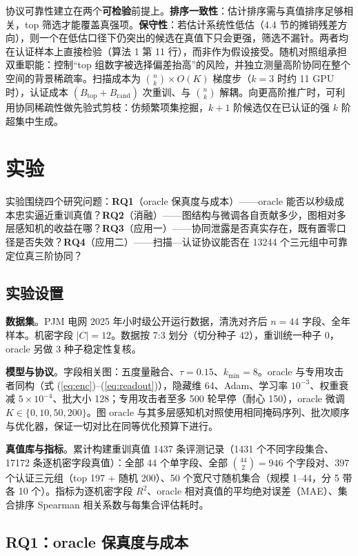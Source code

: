 \documentclass[10.5pt,compsoc,UTF8]{CjC}
\theoremstyle{mystyle}
\begin{document}
协议可靠性建立在两个\textbf{可检验}前提上。\textbf{排序一致性}：估计排序需与真值排序足够相关，top 筛选才能覆盖真强项。\textbf{保守性}：若估计系统性低估（4.4 节的摊销残差方向），则一个在低估口径下仍突出的候选在真值下只会更强，筛选不漏针。两者均在认证样本上直接检验（算法 1 第 11 行），而非作为假设接受。随机对照组承担双重职能：控制“top 组数字被选择偏差抬高”的风险，并独立测量高阶协同在整个空间的背景稀疏率。扫描成本为 $\binom{n}{k}\times O(K)$ 梯度步（$k=3$ 时约 11 GPU 时），认证成本 $(B_{\mathrm{top}}+B_{\mathrm{rand}})$ 次重训、与 $\binom{n}{k}$ 解耦。向更高阶推广时，可利用协同稀疏性做先验式剪枝：仿频繁项集挖掘，$k{+}1$ 阶候选仅在已认证的强 $k$ 阶超集中生成。

\section{\heiti 实验}

实验围绕四个研究问题：\textbf{RQ1}（oracle 保真度与成本）——oracle 能否以秒级成本忠实逼近重训真值？\textbf{RQ2}（消融）——图结构与微调各自贡献多少，图相对多层感知机的收益在哪？\textbf{RQ3}（应用一）——协同泄露是否真实存在，既有置零口径是否失效？\textbf{RQ4}（应用二）——扫描—认证协议能否在 13244 个三元组中可靠定位真三阶协同？

\subsection{实验设置}

\textbf{数据集}。PJM 电网 2025 年小时级公开运行数据，清洗对齐后 $n=44$ 字段、全年样本。机密字段 $|C|=12$。数据按 7:3 划分（切分种子 42），重训统一种子 0，oracle 另做 3 种子稳定性复核。

\textbf{模型与协议}。字段相关图：五度量融合、$\tau=0.15$、$k_{\min}=8$。oracle 与专用攻击者同构（式 (\ref{eq:enc})--(\ref{eq:readout})），隐藏维 64、Adam、学习率 $10^{-3}$、权重衰减 $5\times10^{-4}$、批大小 128；专用攻击者至多 500 轮早停（耐心 150），oracle 微调 $K\in\{0,10,50,200\}$。图 oracle 与其多层感知机对照使用相同掩码序列、批次顺序与优化器，保证一切对比在同等优化预算下进行。

\textbf{真值库与指标}。累计构建重训真值 1437 条评测记录（1431 个不同字段集合、17172 条逐机密字段真值）：全部 44 个单字段、全部 $\binom{44}{2}=946$ 个字段对、397 个认证三元组（top 197 + 随机 200）、50 个宽尺寸随机集合（规模 1--44，分 5 带各 10 个）。指标为逐机密字段 $R^2$、oracle 相对真值的平均绝对误差（MAE）、集合排序 Spearman 相关系数与每集合评估耗时。

\subsection{RQ1：oracle 保真度与成本}
\end{document}
